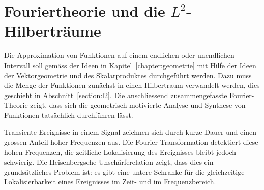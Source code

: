 %
%
%
\chapter{Fouriertheorie und die $L^2$-Hilberträume
\label{chapter:fourier}}
Die Approximation von Funktionen auf einem endlichen oder unendlichen
Intervall soll gemäss der Ideen in Kapitel~\ref{chapter:geometrie}
mit Hilfe der Ideen der Vektorgeometrie und des Skalarproduktes
durchgeführt werden.
Dazu muss die Menge der Funktionen zunächst in einen Hilbertraum
verwandelt werden, dies geschieht in Abschnitt~\ref{section:l2}.
Die anschliessend zusammengefasste Fourier-Theorie zeigt, dass sich
die geometrisch motivierte Analyse und Synthese von Funktionen
tatsächlich durchführen lässt.

Transiente Ereignisse in einem Signal zeichnen sich durch kurze Dauer
und einen grossen Anteil hoher Frequenzen aus.
Die Fourier-Transformation detektiert diese hohen Frequenzen, die
zeitliche Lokalisierung des Ereignisses bleibt jedoch schwierig.
Die Heisenbergsche Unschärferelation zeigt, dass dies ein grundsätzliches
Problem ist: es gibt eine untere Schranke für die gleichzeitige
Lokalisierbarkeit eines Ereignisses im Zeit- und im Frequenzbereich.






